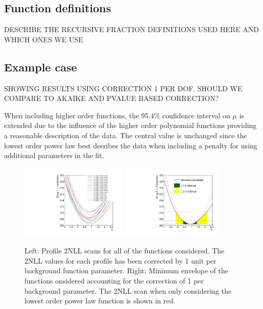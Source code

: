 \subsection{Function definitions}
\label{sec:correction:functions}
DESCRIBE THE RECURSIVE FRACTION DEFINITIONS USED HERE AND WHICH ONES WE USE
\subsection{Example case}
\label{sec:correction:example}

SHOWING RESULTS USING CORRECTION 1 PER DOF. SHOULD WE COMPARE TO AKAIKE AND PVALUE BASED CORRECTION?

When including higher order functions, the 95.4\% confidence interval on $\mu$ is extended 
due to the influence of the higher order polynomial functions providing a reasonable 
description of the data. The central value is unchanged since the lowest order power law 
best desribes the data when including a penalty for using additional parameters in the fit.

\begin{figure}[tbp]
\centering
\includegraphics[width=0.45\textwidth]{correction/ProfilesAllOrders.pdf}
\includegraphics[width=0.45\textwidth]{correction/EnvelopeAllOrders.pdf}
\caption{Left: Profile 2NLL scans for all of the functions considered. The 2NLL values for
each profile has been corrected by 1 unit per background function parameter. 
Right: Minimum envelope of the functions onsidered accounting for the correction of 1 per 
background parameter. The 2NLL scan when only considering the lowest order power law function 
is shown in red.}
\label{fig:correction:profiles}
\end{figure}


